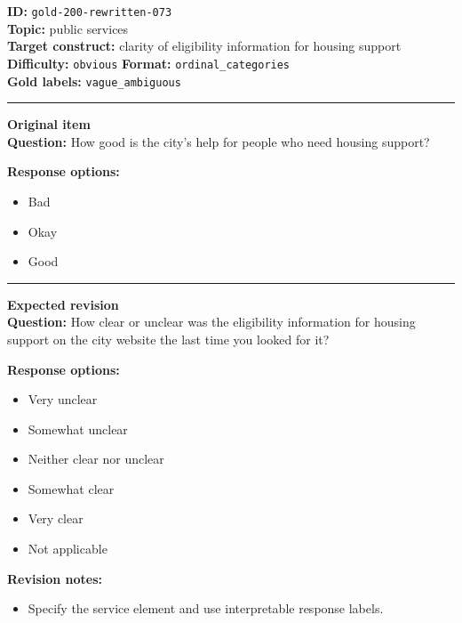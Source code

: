 \documentclass[10pt,a4paper]{article}
\newcommand{\sectionline}{\vspace{0.15em}\hrule\vspace{0.35em}}
\begin{document}
\begin{tcolorbox}[colframe=FlawRed,colback=white,colbacktitle=FlawRed!9,coltitle=black,title={Item 073\hfill Flawed item}]
\textbf{ID:} \texttt{gold-200-rewritten-073}\\
\textbf{Topic:} public services\\
\textbf{Target construct:} clarity of eligibility information for housing support\\
\textbf{Difficulty:} \texttt{obvious} \quad \textbf{Format:} \texttt{ordinal\_categories}\\
\textbf{Gold labels:} \texttt{vague\_ambiguous}\\
\sectionline
\textbf{Original item}\\
\textbf{Question:} How good is the city's help for people who need housing support?
\par\textbf{Response options:}
\begin{itemize}
\item Bad
\item Okay
\item Good
\end{itemize}
\sectionline
\textbf{Expected revision}\\
\textbf{Question:} How clear or unclear was the eligibility information for housing support on the city website the last time you looked for it?
\par\textbf{Response options:}
\begin{itemize}
\item Very unclear
\item Somewhat unclear
\item Neither clear nor unclear
\item Somewhat clear
\item Very clear
\item Not applicable
\end{itemize}
\par\textbf{Revision notes:}
\begin{itemize}
\item Specify the service element and use interpretable response labels.
\end{itemize}
\end{tcolorbox}
\end{document}
